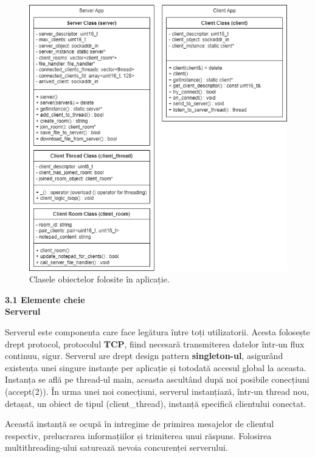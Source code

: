 \documentclass[runningheads]{llncs}
\begin{document}
\begin{figure}[htbp!]
    \hspace{0px} 
    \includegraphics[scale=0.529]{uml.png}
    \caption{Clasele obiectelor folosite în aplicație.}
    \label{fig:yourlabel}
\end{figure}


\newpage
{\bf \large 3.1 Elemente cheie}
\\

{\bf \large Serverul}

Serverul este componenta care face legătura între toți utilizatorii. Acesta folosește drept protocol, protocolul {\bf TCP}, fiind necesară transmiterea
datelor într-un flux continuu, sigur. Serverul are drept design pattern {\bf singleton-ul}, asigurând existența unei singure instanțe per aplicație și totodată accesul global la aceasta.
Instanța se află pe thread-ul main, aceasta ascultând după noi posibile conecțiuni (accept(2)). În urma unei noi conecțiuni, serverul instanțiază, într-un thread nou, detașat,
un obiect de tipul (client\_thread), instanță specifică clientului conectat. 

Această instanță se ocupă în intregime de pri\-mi\-rea mesajelor de clientul respectiv, prelucrarea informațiilor și trimiterea unui răspuns. Folosirea multithreading-ului saturează nevoia concurenței serverului.
\end{document}
